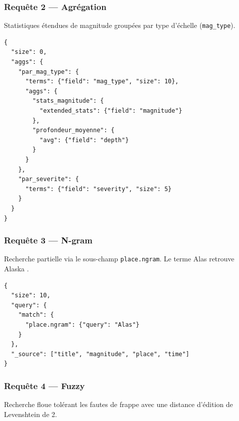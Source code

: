 \documentclass[12pt,a4paper]{article}
\begin{document}
% 

\subsubsection{Requête 2 — Agrégation}

Statistiques étendues de magnitude groupées par type d'échelle (\texttt{mag\_type}).

\begin{lstlisting}[style=json, caption={Agrégation — statistiques par type de magnitude}]
{
  "size": 0,
  "aggs": {
    "par_mag_type": {
      "terms": {"field": "mag_type", "size": 10},
      "aggs": {
        "stats_magnitude": {
          "extended_stats": {"field": "magnitude"}
        },
        "profondeur_moyenne": {
          "avg": {"field": "depth"}
        }
      }
    },
    "par_severite": {
      "terms": {"field": "severity", "size": 5}
    }
  }
}
\end{lstlisting}

% 

\subsubsection{Requête 3 — N-gram}

Recherche partielle via le sous-champ \texttt{place.ngram}. Le terme \og Alas \fg{} retrouve \og Alaska \fg{}.

\begin{lstlisting}[style=json, caption={Requête N-gram — recherche partielle}]
{
  "size": 10,
  "query": {
    "match": {
      "place.ngram": {"query": "Alas"}
    }
  },
  "_source": ["title", "magnitude", "place", "time"]
}
\end{lstlisting}

% 

\subsubsection{Requête 4 — Fuzzy}

Recherche floue tolérant les fautes de frappe avec une distance d'édition de Levenshtein de 2.
\end{document}

